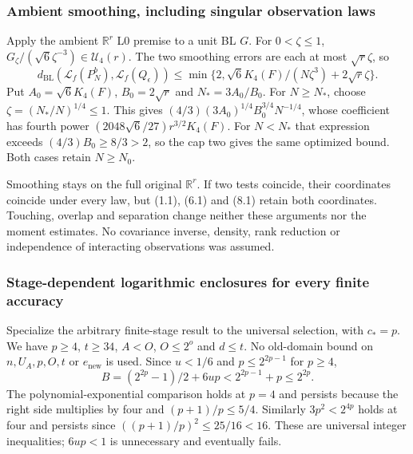 \documentclass[11pt]{article}
\theoremstyle{plain}
\theoremstyle{definition}
\theoremstyle{remark}
\newcommand{\R}{\mathbb{R}}
\begin{document}
\subsubsection{Ambient smoothing, including singular observation laws}
Apply the ambient $\R^r$ L0 premise to a unit BL $G$.
For $0<\zeta\le1$,
$G_\zeta/(\sqrt6\zeta^{-3})\in\mathcal U_4(r)$.
The two smoothing errors are each at most $\sqrt r\zeta$, so
\begin{equation}
 d_{\mathrm{BL}}(\mathcal L_f(P_N^b),\mathcal L_f(Q_\epsilon))
 \le\min\{2,\sqrt6K_4(F)/(N\zeta^3)+2\sqrt r\zeta\}.\tag{8.1}
\end{equation}
Put $A_0=\sqrt6K_4(F)$, $B_0=2\sqrt r$ and $N_*=3A_0/B_0$.
For $N\ge N_*$, choose $\zeta=(N_*/N)^{1/4}\le1$. This gives
$(4/3)(3A_0)^{1/4}B_0^{3/4}N^{-1/4}$, whose coefficient has fourth
power $(2048\sqrt6/27)r^{3/2}K_4(F)$.
For $N<N_*$ that expression exceeds $(4/3)B_0\ge8/3>2$, so the cap
two gives the same optimized bound. Both cases retain $N\ge N_0$.

Smoothing stays on the full original $\R^r$. If two tests coincide,
their coordinates coincide under every law, but (1.1), (6.1) and (8.1)
retain both coordinates. Touching, overlap and separation change neither
these arguments nor the moment estimates. No covariance inverse, density,
rank reduction or independence of interacting observations was assumed.

\subsubsection{Stage-dependent logarithmic enclosures for every finite accuracy}
Specialize the arbitrary finite-stage result to the universal selection,
with $c_*=p$. We have $p\ge4$, $t\ge34$, $A<O$, $O\le2^o$ and $d\le t$.
No old-domain bound on $n,U_A,p,O,t$ or $e_{\mathrm{new}}$ is used.
Since $u<1/6$ and $p\le2^{2p-1}$ for $p\ge4$,
\begin{equation}
 B=(2^{2p}-1)/2+6up<2^{2p-1}+p\le2^{2p}.\tag{9.1}
\end{equation}
The polynomial-exponential comparison holds at $p=4$ and persists because
the right side multiplies by four and $(p+1)/p\le5/4$.
Similarly $3p^2<2^{4p}$ holds at four and persists since
$((p+1)/p)^2\le25/16<16$. These are universal integer inequalities;
$6up<1$ is unnecessary and eventually fails.
\end{document}
